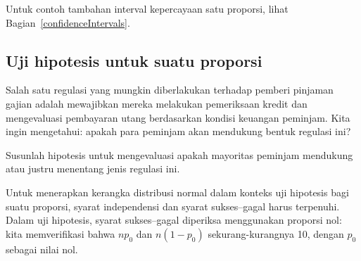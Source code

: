 \onepropconfintsummary{}

\noindent%
Untuk contoh tambahan interval kepercayaan satu proporsi,
lihat Bagian~\ref{confidenceIntervals}.

\subsection{Uji hipotesis untuk suatu proporsi}
\label{htForPropSection}

\newcommand{\paydayCCPerc}{51\%}
\newcommand{\paydayCCProp}{0.51}
\newcommand{\paydayCCSE}{0.017}
\newcommand{\paydayCCSEPerc}{1.7\%}
\newcommand{\paydayCCZ}{0.59}
\newcommand{\paydayCCOneTail}{0.2776}
\newcommand{\paydayCCPvalue}{0.5552}

Salah satu regulasi yang mungkin diberlakukan terhadap pemberi pinjaman
gajian adalah mewajibkan mereka melakukan pemeriksaan kredit dan
mengevaluasi pembayaran utang berdasarkan kondisi keuangan peminjam.
Kita ingin mengetahui: apakah para peminjam akan mendukung bentuk
regulasi ini?


\begin{exercisewrap}
\begin{nexercise}
\label{paydayCC_hypotheses_gp}%
Susunlah hipotesis untuk mengevaluasi apakah mayoritas peminjam
mendukung atau justru menentang jenis
regulasi ini.\footnotemark
\end{nexercise}
\end{exercisewrap}

Untuk menerapkan kerangka distribusi normal dalam konteks
uji hipotesis bagi suatu proporsi, syarat independensi
dan syarat sukses--gagal harus terpenuhi.
Dalam uji hipotesis, syarat sukses--gagal
diperiksa menggunakan proporsi nol:
kita memverifikasi bahwa $np_0$ dan $n(1-p_0)$ sekurang-kurangnya 10,
dengan $p_0$ sebagai nilai nol.

